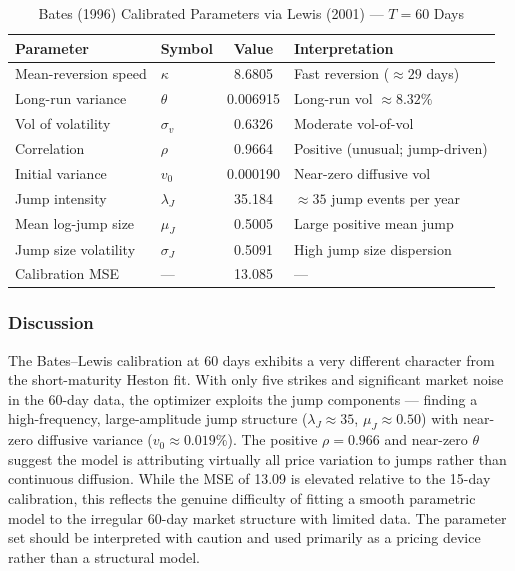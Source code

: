 \documentclass[12pt,a4paper]{article}
\newcommand{\thead}[1]{\cellcolor{headernavy}\color{white}\textbf{#1}}
\newcommand{\rowA}{\rowcolor{white}}
\newcommand{\rowB}{\rowcolor{rowgray}}
\begin{document}
\begin{table}[H]
  \centering
  \caption{Bates (1996) Calibrated Parameters via Lewis (2001) --- $T = 60$ Days}
  \label{tab:bates_lewis_params}
  \begin{tabular}{llcl}
    \hline
    \thead{Parameter} & \thead{Symbol} & \thead{Value} & \thead{Interpretation} \\
    \hline
    \rowA Mean-reversion speed   & $\kappa$    & 8.6805   & Fast reversion ($\approx 29$ days) \\
    \rowB Long-run variance      & $\theta$    & 0.006915 & Long-run vol $\approx 8.32\%$ \\
    \rowA Vol of volatility      & $\sigma_v$  & 0.6326   & Moderate vol-of-vol \\
    \rowB Correlation            & $\rho$      & 0.9664   & Positive (unusual; jump-driven) \\
    \rowA Initial variance       & $v_0$       & 0.000190 & Near-zero diffusive vol \\
    \rowB Jump intensity         & $\lambda_J$ & 35.184   & $\approx 35$ jump events per year \\
    \rowA Mean log-jump size     & $\mu_J$     & 0.5005   & Large positive mean jump \\
    \rowB Jump size volatility   & $\sigma_J$  & 0.5091   & High jump size dispersion \\
    \hline
    \rowA Calibration MSE        & ---         & 13.085   & --- \\
    \hline
  \end{tabular}
\end{table}

\subsubsection{Discussion}

The Bates--Lewis calibration at 60 days exhibits a very different character from the short-maturity Heston fit. With only five strikes and significant market noise in the 60-day data, the optimizer exploits the jump components --- finding a high-frequency, large-amplitude jump structure ($\lambda_J \approx 35$, $\mu_J \approx 0.50$) with near-zero diffusive variance ($v_0 \approx 0.019\%$). The positive $\rho = 0.966$ and near-zero $\theta$ suggest the model is attributing virtually all price variation to jumps rather than continuous diffusion. While the MSE of 13.09 is elevated relative to the 15-day calibration, this reflects the genuine difficulty of fitting a smooth parametric model to the irregular 60-day market structure with limited data. The parameter set should be interpreted with caution and used primarily as a pricing device rather than a structural model.
\end{document}
